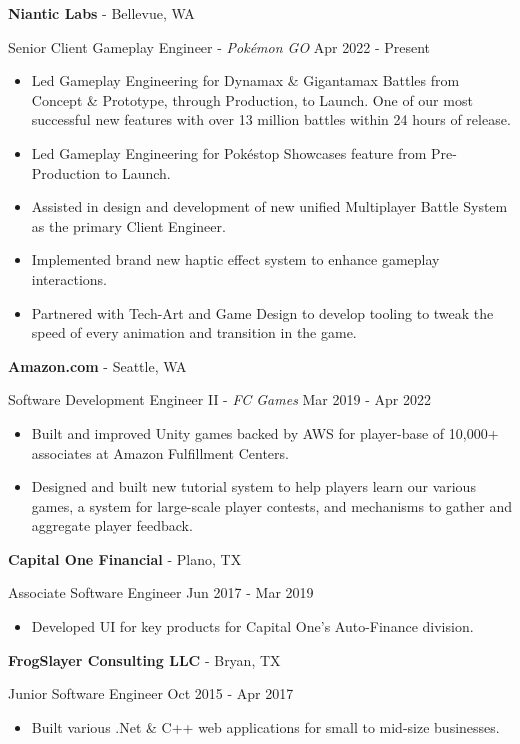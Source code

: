 \documentclass[resmargin,10pt]{res} %
\begin{document}
\begin{resume}
     {\bf Niantic Labs} - Bellevue, WA \\
    \begin{ncolumn}{1}
        Senior Client Gameplay Engineer - \textit{Pokémon GO} \hfill Apr 2022 - Present
    \end{ncolumn}
    \begin{itemize}
        \setlength\itemsep{-0.0em}
        \item Led Gameplay Engineering for Dynamax \& Gigantamax Battles from Concept \& Prototype, through Production, to Launch. One of our most successful new features with over 13 million battles within 24 hours of release.
        \item Led Gameplay Engineering for Pokéstop Showcases feature from Pre-Production to Launch.
        \item Assisted in design and development of new unified Multiplayer Battle System as the primary Client Engineer.
        \item Implemented brand new haptic effect system to enhance gameplay interactions.
        \item Partnered with Tech-Art and Game Design to develop tooling to tweak the speed of every animation and transition in the game.
    \end{itemize}
    {\bf Amazon.com} - Seattle, WA \\
    \begin{ncolumn}{1} %
        Software Development Engineer II - \textit{FC Games}  \hfill Mar 2019 - Apr 2022
    \end{ncolumn}
    \begin{itemize}
        \setlength\itemsep{-0.0em}
        \item Built and improved Unity games backed by AWS for player-base of 10,000+ associates at Amazon Fulfillment Centers.
        \item Designed and built new tutorial system to help players learn our various games, a system for large-scale player contests, and mechanisms to gather and aggregate player feedback.
    \end{itemize}
    {\bf Capital One Financial} - Plano, TX \\
    \begin{ncolumn}{1}
        Associate Software Engineer \hfill Jun 2017 - Mar 2019
    \end{ncolumn}
    \begin{itemize}
        \item Developed UI for key products for Capital One's Auto-Finance division.
    \end{itemize}
    {\bf FrogSlayer Consulting LLC} - Bryan, TX \\
    \begin{ncolumn}{1} %
        Junior Software Engineer \hfill Oct 2015 - Apr 2017
    \end{ncolumn}
    \begin{itemize}
        \setlength\itemsep{-0.0em}
        \item  Built various .Net \& C++ web applications for small to mid-size businesses.
    \end{itemize}


\end{resume}
\end{document}
